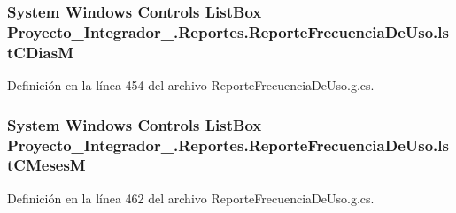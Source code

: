 \hypertarget{class_proyecto___integrador__3_1_1_reportes_1_1_reporte_frecuencia_de_uso_a8ce6aa1fd7ce5c054b011ee702ee1d03}{
\subsubsection[{lst\-C\-Dias\-M}]{\setlength{\rightskip}{0pt plus 5cm}System Windows Controls List\-Box Proyecto\-\_\-\-Integrador\-\_.\-Reportes.\-Reporte\-Frecuencia\-De\-Uso.\-lst\-C\-Dias\-M\hspace{0.3cm}{\ttfamily [package]}}}\label{class_proyecto___integrador__3_1_1_reportes_1_1_reporte_frecuencia_de_uso_a8ce6aa1fd7ce5c054b011ee702ee1d03}


Definición en la línea 454 del archivo Reporte\-Frecuencia\-De\-Uso.\-g.\-cs.

\hypertarget{class_proyecto___integrador__3_1_1_reportes_1_1_reporte_frecuencia_de_uso_ad82bcab9a8b0b8d06f3c9b604da3c3be}{
\subsubsection[{lst\-C\-Meses\-M}]{\setlength{\rightskip}{0pt plus 5cm}System Windows Controls List\-Box Proyecto\-\_\-\-Integrador\-\_.\-Reportes.\-Reporte\-Frecuencia\-De\-Uso.\-lst\-C\-Meses\-M\hspace{0.3cm}{\ttfamily [package]}}}\label{class_proyecto___integrador__3_1_1_reportes_1_1_reporte_frecuencia_de_uso_ad82bcab9a8b0b8d06f3c9b604da3c3be}


Definición en la línea 462 del archivo Reporte\-Frecuencia\-De\-Uso.\-g.\-cs.


